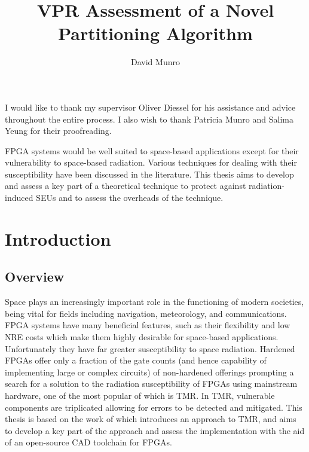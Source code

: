 \documentclass[12pt,final,oneside]{dwThesis} %
\title{VPR Assessment of a Novel Partitioning Algorithm}
\author{David Munro}
\begin{document}
   \maketitle

   \begin{acknowledgements}
      I would like to thank my supervisor Oliver Diessel
      for his assistance and advice throughout the entire process. I also wish
      to thank Patricia Munro and Salima Yeung for their proofreading.


   \end{acknowledgements}

   \begin{abstracts}
      \gls{FPGA} systems would be well
      suited to space-based applications except for their vulnerability to
      space-based radiation. Various techniques for dealing with their
      susceptibility have been discussed in the literature. This thesis aims to
      develop and assess a key part of a theoretical technique to protect
      against radiation-induced \glspl{SEU} and to assess the overheads of the
      technique.  \glsresetall 
   \end{abstracts}
   \newpage \tableofcontents*
   \listoffixmes \newpage \printglossaries 
   \chapter{Introduction}

   \section{Overview}
   Space plays an increasingly
   important role in the functioning of modern societies, being vital for
   fields including navigation, meteorology, and
   communications\cite{OECDSpace}. \gls{FPGA} systems have many beneficial
   features, such as their flexibility and low \gls{NRE} costs which make them
   highly desirable for space-based applications. Unfortunately they have far
   greater susceptibility to space radiation. Hardened \glspl{FPGA} offer only
   a fraction of the gate counts (and hence capability of implementing large or
   complex circuits) of non-hardened offerings prompting a search for a
   solution to the radiation susceptibility of \glspl{FPGA} using mainstream
   hardware, one of the most popular of which is \gls{TMR}\cite{VFPGATMR}. In
   \gls{TMR}, vulnerable components are triplicated allowing for errors to be
   detected and mitigated. This thesis is based on the work
   of\cite{DiesselChange} which introduces an approach to \gls{TMR}, and aims
   to develop a key part of the approach and assess the implementation with the
   aid of an open-source \gls{CAD} toolchain for \glspl{FPGA}.
   
\end{document}
